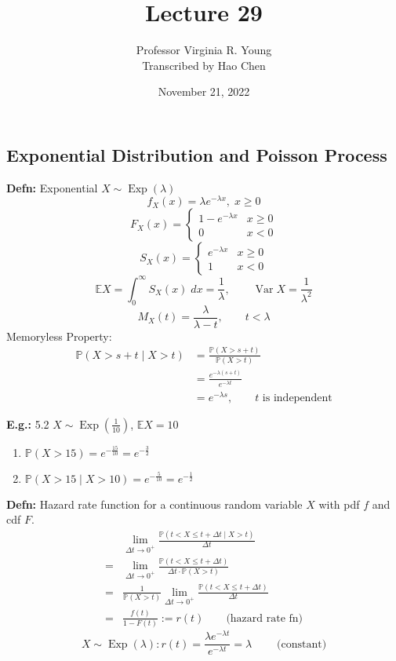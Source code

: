 \documentclass[a4paper]{article}
\title{Lecture 29}
\author{Professor Virginia R. Young\\ \small{Transcribed by Hao Chen}}
\date{November 21, 2022}
\newcommand{\n}{\hfill\break}
\newcommand{\defn}[1]{\par\noindent\settowidth{\hangindent}{\textbf{Defn: }}\textbf{Defn: }#1\n}
\newcommand{\eg}[1]{\par\noindent\settowidth{\hangindent}{\textbf{E.g.: }}\textbf{E.g.: }#1\n}
\newcommand{\Prob}{\mathbb{P}}
\renewcommand{\P}{\Prob}
\newcommand{\Avg}{\mathbb{E}}
\newcommand{\E}{\Avg}
\DeclareMathOperator{\Var}{Var}
\DeclareMathOperator{\Exp}{\text{Exp}}
\begin{document}
\maketitle

\subsection*{Exponential Distribution and Poisson Process}

\defn{
Exponential $X\sim\Exp(\lambda)$
\[f_X(x)=\lambda e^{-\lambda x},\;x\geq0\]
\[F_X(x)=\left\{\begin{array}{lc} 1-e^{-\lambda x} & x\geq0 \\ 0 & x<0 \end{array}\right.\]
\[S_X(x)=\left\{\begin{array}{lc} e^{-\lambda x} & x\geq0 \\ 1 & x<0 \end{array}\right.\]
\[\E X=\int^\infty_0 S_X(x)\;dx=\frac{1}{\lambda}, \qquad \Var X=\frac{1}{\lambda^2}\]
\[M_X(t)=\frac{\lambda}{\lambda-t}, \qquad t<\lambda\]
Memoryless Property:
\begin{align*}
    \P(X>s+t\mid X>t)&=\frac{\P(X>s+t)}{\P(X>t)} \\
    &=\frac{e^{-\lambda(s+t)}}{e^{-\lambda t}} \\
    &=e^{-\lambda s}, \qquad\text{$t$ is independent}
\end{align*}
}

\eg{
5.2 $X\sim\Exp(\frac{1}{10})$, $\E X=10$
\begin{enumerate}
    \item $\P(X>15)=e^{-\frac{15}{10}}=e^{-\frac{3}{2}}$
    \item $\P(X>15\mid X>10)=e^{-\frac{5}{10}}=e^{-\frac{1}{2}}$
\end{enumerate}
}

\defn{
Hazard rate function for a continuous random variable $X$ with pdf $f$ and cdf $F$.
\begin{align*}
    &\lim_{\Delta t\rightarrow 0^+}\frac{\P(t<X\leq t+\Delta t\mid X>t)}{\Delta t} \\
    =&\lim_{\Delta t\rightarrow 0^+}\frac{\P(t<X\leq t+\Delta t)}{\Delta t\cdot \P(X>t)} \\
    =&\frac{1}{\P(X>t)}\lim_{\Delta t\rightarrow 0^+}\frac{\P(t<X\leq t+\Delta t)}{\Delta t} \\
    =&\frac{f(t)}{1-F(t)}:=r(t)\qquad\text{(hazard rate fn)}
\end{align*}
\[X\sim\Exp(\lambda):r(t)=\frac{\lambda e^{-\lambda t}}{e^{-\lambda t}}=\lambda\;\qquad\text{(constant)}\]
}
\end{document}

